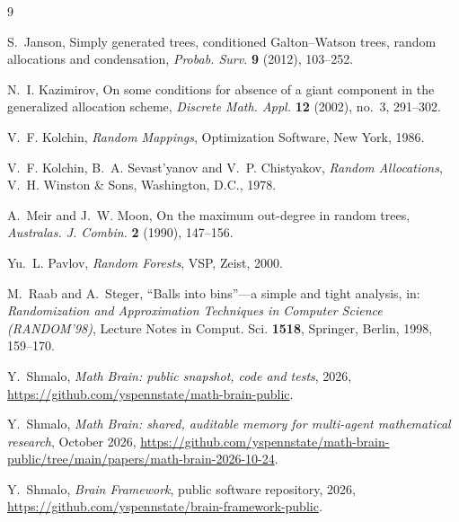 \documentclass[11pt]{amsart}
\theoremstyle{remark}
\numberwithin{equation}{section}
\begin{document}
\begin{thebibliography}{9}

S.~Janson, Simply generated trees, conditioned Galton--Watson trees, random allocations and condensation, \emph{Probab. Surv.} \textbf{9} (2012), 103--252.

N.~I. Kazimirov, On some conditions for absence of a giant component in the generalized allocation scheme, \emph{Discrete Math. Appl.} \textbf{12} (2002), no.~3, 291--302.

V.~F. Kolchin, \emph{Random Mappings}, Optimization Software, New York, 1986.

V.~F. Kolchin, B.~A. Sevast'yanov and V.~P. Chistyakov, \emph{Random Allocations}, V.~H. Winston \& Sons, Washington, D.C., 1978.

A.~Meir and J.~W. Moon, On the maximum out-degree in random trees, \emph{Australas. J. Combin.} \textbf{2} (1990), 147--156.

Yu.~L. Pavlov, \emph{Random Forests}, VSP, Zeist, 2000.

M.~Raab and A.~Steger, ``Balls into bins''---a simple and tight analysis, in: \emph{Randomization and Approximation Techniques in Computer Science (RANDOM'98)}, Lecture Notes in Comput. Sci. \textbf{1518}, Springer, Berlin, 1998, 159--170.

 Y.~Shmalo, \emph{Math Brain: public snapshot, code and tests}, 2026, \url{https://github.com/yspennstate/math-brain-public}.

 Y.~Shmalo, \emph{Math Brain: shared, auditable memory for multi-agent mathematical research}, October 2026, \url{https://github.com/yspennstate/math-brain-public/tree/main/papers/math-brain-2026-10-24}.

 Y.~Shmalo, \emph{Brain Framework}, public software repository, 2026, \url{https://github.com/yspennstate/brain-framework-public}.

\end{thebibliography}
\end{document}
